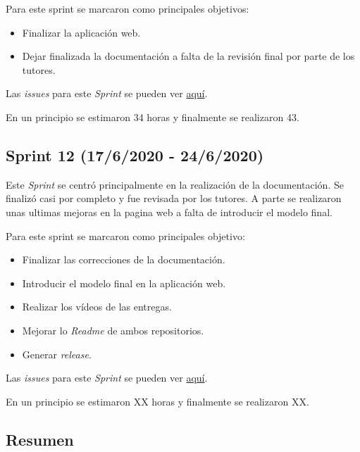 Para este sprint se marcaron como principales objetivos:
\begin{itemize}
	\item Finalizar la aplicación web.
	\item Dejar finalizada la documentación a falta de la revisión final por parte de los tutores.
\end{itemize} 

Las \emph{issues} para este \emph{Sprint} se pueden ver \href{https://github.com/psnti/TFG-Pablo-Santidrian-Tudanca/milestone/11}{aquí}.


En un principio se estimaron 34 horas y finalmente se realizaron 43.

\subsection{Sprint 12 (17/6/2020 - 24/6/2020)}\label{Sprint-11}

Este \emph{Sprint} se centró principalmente en la realización de la documentación. Se finalizó casi por completo y fue revisada por los tutores. A parte se realizaron unas ultimas mejoras en la pagina web a falta de introducir el modelo final.

Para este sprint se marcaron como principales objetivo:
\begin{itemize}
	\item Finalizar las correcciones de la documentación.
	\item Introducir el modelo final en la aplicación web.
	\item Realizar los vídeos de las entregas.
	\item Mejorar lo \emph{Readme} de ambos repositorios.
	\item Generar \emph{release}.
\end{itemize} 

Las \emph{issues} para este \emph{Sprint} se pueden ver \href{https://github.com/psnti/TFG-Pablo-Santidrian-Tudanca/milestone/12}{aquí}.


En un principio se estimaron XX horas y finalmente se realizaron XX.

\subsection{Resumen}

